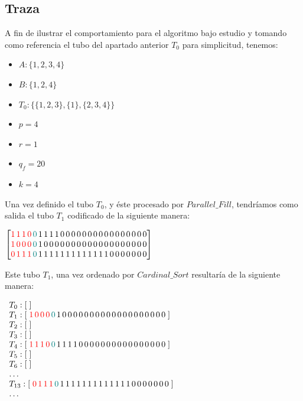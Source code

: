 \documentclass[12pt, letterpaper, twoside]{article}
\begin{document}
    \newpage
    \subsection{Traza}
    A fin de ilustrar el comportamiento para el algoritmo bajo estudio y tomando como referencia el tubo del apartado anterior $T_0$ para simplicitud, tenemos:
    \begin{multicols}{2}
        \begin{itemize}
        \item $A: \{1, 2, 3, 4\}$
        \item $B: \{1, 2, 4\}$
        \item $T_0: \{\{1,2,3\}, \{1\}, \{2,3,4\}\}$
        \item $p = 4$
        \item $r = 1$
        \item $q_f= 20$
        \item $k =4$
        \end{itemize}
    \end{multicols}


    Una vez definido el tubo $T_0$, y éste procesado por $Parallel\_Fill$, tendríamos como salida el tubo $T_1$ codificado de la siguiente manera:

    $
        \begin{bmatrix}
            \textcolor{red}{1\,1\,1\,0}\textcolor{teal}{\,0}\,1\,1\,1\,1\,0\,0\,0\,0\,0\,0\,0\,0\,0\,0\,0\,0\,0\,0\,0\,0\\
            \textcolor{red}{1\,0\,0\,0}\textcolor{teal}{\,0}\,1\,0\,0\,0\,0\,0\,0\,0\,0\,0\,0\,0\,0\,0\,0\,0\,0\,0\,0\,0 \\
            \textcolor{red}{0\,1\,1\,1}\textcolor{teal}{\,0}\,1\,1\,1\,1\,1\,1\,1\,1\,1\,1\,1\,1\,1\,0\,0\,0\,0\,0\,0\,0
        \end{bmatrix}
    $


    Este tubo $T_1$, una vez ordenado por $Cardinal\_Sort$ resultaría de la siguiente manera:

    $
    \begin{array}{l}
        T_0: [\;] \\
        T_1: [\;\textcolor{red}{1\,0\,0\,0}\textcolor{teal}{\,0}\,1\,0\,0\,0\,0\,0\,0\,0\,0\,0\,0\,0\,0\,0\,0\,0\,0\,0\,0\,0\;] \\
        T_2: [\;] \\
        T_3: [\;] \\
        T_4: [\;\textcolor{red}{1\,1\,1\,0}\textcolor{teal}{\,0}\,1\,1\,1\,1\,0\,0\,0\,0\,0\,0\,0\,0\,0\,0\,0\,0\,0\,0\,0\,0\;] \\
        T_5: [\;] \\
        T_6: [\;] \\
        \dots \\
        T_{13}: [\;\textcolor{red}{0\,1\,1\,1}\textcolor{teal}{\,0}\,1\,1\,1\,1\,1\,1\,1\,1\,1\,1\,1\,1\,1\,0\,0\,0\,0\,0\,0\,0\;] \\
        \dots
    \end{array}
    $ 
\end{document}
